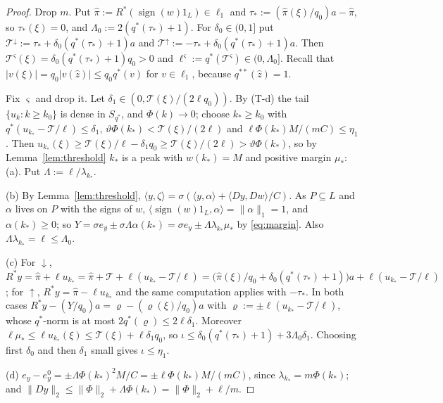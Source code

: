 \documentclass[10pt]{amsart}
\theoremstyle{definition}
\theoremstyle{remark}
\newcommand{\sgn}{\operatorname{sign}}
\newcommand{\zh}{\hat z}
\newcommand{\ip}[2]{\langle #1,#2\rangle}
\begin{document}
\begin{proof}
Drop $m$.  Put $\hat\pi:=R^*(\sgn(w)1_L)\in\ell_1$ and
$\tau_*:=(\hat\pi(\xi)/q_0)a-\hat\pi$, so $\tau_*(\xi)=0$, and
$\Lambda_0:=2(q^*(\tau_*)+1)$.  For $\delta_0\in(0,1]$ put
$\mathcal T^\downarrow:=\tau_*+\delta_0(q^*(\tau_*)+1)a$ and $\mathcal
T^\uparrow:=-\tau_*+\delta_0(q^*(\tau_*)+1)a$.  Then $\mathcal
T^\varsigma(\xi)=\delta_0(q^*(\tau_*)+1)q_0>0$ and $\ell^\varsigma:=q^*(\mathcal
T^\varsigma)\in(0,\Lambda_0]$.  Recall that $|v(\xi)|=q_0|v(\zh)|\le q_0q^*(v)$
for $v\in\ell_1$, because $q^{**}(\zh)=1$.

Fix $\varsigma$ and drop it.  Let $\delta_1\in(0,\mathcal
T(\xi)/(2\ell q_0))$.  By (T-d) the tail $\{u_k:k\ge k_0\}$ is dense in
$S_{q^*}$, and $\Phi(k)\to0$; choose $k_*\ge k_0$ with $q^*(u_{k_*}-\mathcal
T/\ell)\le\delta_1$, $\vartheta\Phi(k_*)<\mathcal T(\xi)/(2\ell)$ and
$\ell\Phi(k_*)M/(mC)\le\eta_1$.  Then $u_{k_*}(\xi)\ge\mathcal
T(\xi)/\ell-\delta_1q_0\ge\mathcal T(\xi)/(2\ell)>\vartheta\Phi(k_*)$, so
by Lemma~\ref{lem:threshold} $k_*$ is a peak with $w(k_*)=M$ and positive
margin $\mu_*$: (a).  Put $\Lambda:=\ell/\lambda_{k_*}$.

(b) By Lemma~\ref{lem:threshold}, $\ip{y}{\zeta}=\sigma(\ip y\alpha+
\ip{Dy}{Dw}/C)$.  As $P\subseteq L$ and $\alpha$ lives on $P$ with the signs
of $w$, $\ip{\sgn(w)1_L}{\alpha}=\|\alpha\|_1=1$, and $\alpha(k_*)\ge0$; so
$Y=\sigma e_y\pm\sigma\Lambda\alpha(k_*)=\sigma e_y\pm\Lambda\lambda_{k_*}\mu_*$
by \eqref{eq:margin}.  Also $\Lambda\lambda_{k_*}=\ell\le\Lambda_0$.

(c) For $\downarrow$, $R^*y=\hat\pi+\ell u_{k_*}=\hat\pi+\mathcal T+\ell
(u_{k_*}-\mathcal T/\ell)=\big(\hat\pi(\xi)/q_0+\delta_0(q^*(\tau_*)+1)\big)a+
\ell(u_{k_*}-\mathcal T/\ell)$; for $\uparrow$, $R^*y=\hat\pi-\ell u_{k_*}$
and the same computation applies with $-\tau_*$.  In both cases
$R^*y-(Y/q_0)a=\varrho-(\varrho(\xi)/q_0)a$ with
$\varrho:=\pm\ell(u_{k_*}-\mathcal T/\ell)$, whose $q^*$-norm is at most
$2q^*(\varrho)\le2\ell\delta_1$.  Moreover $\ell\mu_*\le\ell u_{k_*}(\xi)\le
\mathcal T(\xi)+\ell\delta_1q_0$, so
$\iota\le\delta_0(q^*(\tau_*)+1)+3\Lambda_0\delta_1$.  Choosing first
$\delta_0$ and then $\delta_1$ small gives $\iota\le\eta_1$.

(d) $e_y-e^0_y=\pm\Lambda\Phi(k_*)^2M/C=\pm\ell\Phi(k_*)M/(mC)$, since
$\lambda_{k_*}=m\Phi(k_*)$; and $\|Dy\|_2\le\|\Phi\|_2+\Lambda\Phi(k_*)=
\|\Phi\|_2+\ell/m$.
\end{proof}
\end{document}
